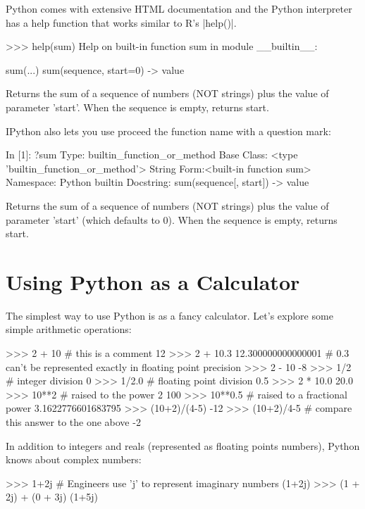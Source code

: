 Python comes with extensive HTML documentation and the Python
interpreter has a help function that works similar to R's
|help()|.
%
\begin{python}
>>> help(sum)
Help on built-in function sum in module __builtin__:

sum(...)
    sum(sequence, start=0) -> value

    Returns the sum of a sequence of numbers (NOT strings) plus the value
    of parameter 'start'.  When the sequence is empty, returns start.
\end{python}
%
IPython also lets you use proceed the function name with a question
mark:
%
\begin{python}
In [1]: ?sum
Type:       builtin_function_or_method
Base Class: <type 'builtin_function_or_method'>
String Form:<built-in function sum>
Namespace:  Python builtin
Docstring:
sum(sequence[, start]) -> value

Returns the sum of a sequence of numbers (NOT strings) plus the value
of parameter 'start' (which defaults to 0).  When the sequence is
empty, returns start.
\end{python}


\section{Using Python as a Calculator}

The simplest way to use Python is as a fancy calculator. Let's explore some simple arithmetic operations:
%
\begin{python}
>>> 2 + 10   # this is a comment
12
>>> 2 + 10.3
 12.300000000000001  # 0.3 can't be represented exactly in floating point precision
>>> 2 - 10
-8
>>> 1/2  # integer division
0
>>> 1/2.0  # floating point division
0.5
>>> 2 * 10.0
20.0
>>> 10**2  # raised to the power 2
100
>>> 10**0.5  # raised to a fractional power
3.1622776601683795
>>> (10+2)/(4-5)
-12
>>> (10+2)/4-5  # compare this answer to the one above 
-2
\end{python}
%
In addition to integers and reals (represented as floating points
numbers), Python knows about complex numbers:
%
\begin{python}
>>> 1+2j  # Engineers use 'j' to represent imaginary numbers
(1+2j)
>>> (1 + 2j) + (0 + 3j)
(1+5j)
\end{python}

